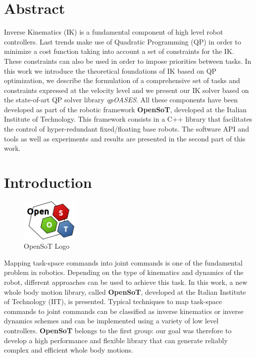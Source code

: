 \def\q{\mathbf{q}}
\def\dq{\mathbf{\dot{q}}}
\def\J{\mathbf{J}}
\def\A{\mathbf{A}}
\def\B{\mathcal{B}}
\def\C{\mathcal{C}}
\def\T{\mathcal{T}}
\def\W{\mathbf{W}}
\def\b{\mathbf{b}}
\def\I{\mathbf{I}}
\def\x{\mathbf{x}}
\def\dx{\mathbf{\dot{x}}}
\def\e{\mathbf{e}}
\def\de{\mathbf{\dot{e}}}
\def\w{\mathbf{w}}

\section{Abstract}
\label{sec:abstract}
Inverse Kinematics (IK) is a fundamental component of high level robot controllers. Last trends make use of Quadratic Programming (QP) in order to minimize a cost function taking into account a set of constraints for the IK. These constraints can also be used in order to impose priorities between tasks. In this work we introduce the theoretical foundations of IK based on QP optimization, we describe the formulation of a comprehensive set of tasks and constraints expressed at the velocity level and we present our IK solver based on the state-of-art QP solver library \emph{qpOASES}. All these components have been developed as part of the robotic framework \textbf{OpenSoT}, developed at the Italian Institute of Technology. This framework consists in a C++ library that facilitates the control of hyper-redundant fixed/floating base robots. The software API and tools as well as experiments and results are presented in the second part of this work.

\section{Introduction}
\label{sec:introduction}
\begin{figure}
  \begin{center}
    \includegraphics[width=0.25\textwidth]{images/openSoT_stickers}
  \end{center}
  \caption{OpenSoT Logo}
\end{figure}
Mapping task-space commands into joint commands is one of the fundamental problem in robotics. Depending on the type of kinematics and dynamics of the robot, different approaches can be used to achieve this task. In this work, a new whole body motion library, called \textbf{OpenSoT}, developed at the Italian Institute of Technology (IIT), is presented. 
Typical techniques to map task-space commands to joint commands can be classified as inverse kinematics or inverse dynamics schemes and can be implemented using a variety of low level controllers. \textbf{OpenSoT} belongs to the first group: our goal was therefore to develop a high performance and flexible library that can generate reliably complex and efficient whole body motions.

